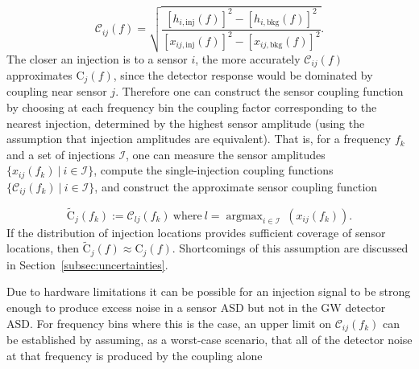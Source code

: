 \begin{equation}\label{eq:sicf}
	\mathcal{C}_{ij}(f) = \sqrt{\frac{[h_{i,\textrm{inj}}(f)]^2 - [h_{i,\textrm{bkg}}(f)]^2}{[x_{ij,\textrm{inj}}(f)]^2 - [x_{ij,\textrm{bkg}}(f)]^2}}.
\end{equation}
The closer an injection is to a sensor $i$, the more accurately $\mathcal{C}_{ij}(f)$ approximates $\mathrm{C}_j(f)$, since the detector response would be dominated by coupling near sensor $j$.
Therefore one can construct the sensor coupling function by choosing at each frequency bin the coupling factor corresponding to the nearest injection, determined by the highest sensor amplitude (using the assumption that injection amplitudes are equivalent).
That is, for a frequency $f_k$ and a set of injections $\mathcal{I}$, one can measure the sensor amplitudes $\{x_{ij}(f_k)\ |\ i \in \mathcal{I}\}$, compute the single-injection coupling functions $\{\mathcal{C}_{ij}(f_k)\ |\ i \in \mathcal{I}\}$, and construct the approximate sensor coupling function

\begin{equation}\label{eq:ccf}
	\widetilde{\mathrm{C}}_j(f_k) := \mathcal{C}_{lj}(f_k)\ \mathrm{where}\ l = \mathop{argmax}_{i\in\mathcal{I}}\ (x_{ij}(f_k)).
\end{equation}
If the distribution of injection locations provides sufficient coverage of sensor locations, then $\widetilde{\mathrm{C}}_j(f) \approx \mathrm{C}_j(f)$.
Shortcomings of this assumption are discussed in Section~\ref{subsec:uncertainties}.

Due to hardware limitations it can be possible for an injection signal to be strong enough to produce excess noise in a sensor \ac{ASD} but not in the \ac{GW} detector \ac{ASD}.
For frequency bins where this is the case, an upper limit on $\mathcal{C}_{ij}(f_k)$ can be established by assuming, as a worst-case scenario, that all of the detector noise at that frequency is produced by the coupling alone

